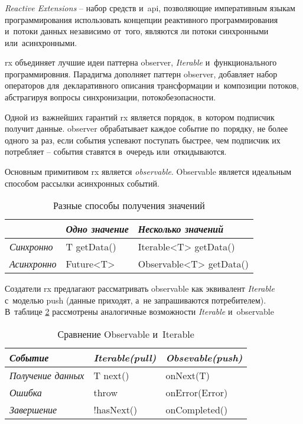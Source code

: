 \subsubsection{}
\label{sec:analysis:research:mobArch:rx}

\emph{Reactive Extensions} -- набор средств и~\gls{api}, позволяющие императивным языкам программирования использовать концепции реактивного программирования и~потоки данных независимо от~того, являются ли потоки синхронными или~асинхронными\cite{wiki:rx}.

\gls{rx} объединяет лучшие идеи паттерна \gls{observer}, \textit{Iterable} и~функционального программировния. Парадигма дополняет паттерн \gls{observer}, добавляет набор операторов для~декларативного описания трансформации и~композиции потоков, абстрагируя вопросы синхронизации, потокобезопасности.

Одной из~важнейших гарантий \gls{rx} является порядок, в~котором подписчик получит данные. \gls{observer} обрабатывает каждое событие по~порядку, не более одного за раз, если события успевают поступать быстрее, чем подписчик их потребляет -- события ставятся в~очередь или~откидываются.

Основным примитивом \gls{rx} является \emph{\gls{observable}}. Observable является идеальным способом рассылки асинхронных событий\cite{programming-in-haskell}.

\begin{table}[h!]
\caption{Разные способы получения значений}
\label{theory:archeticture:rx:call}
\centering
\begin{tabularx}{\textwidth}{ |X|X|X| } 
 \hline
  & \emph{Одно значение} & \emph{Несколько значений} \\ 
 \hline
 \emph{Синхронно} & T getData() & Iterable<T> getData() \\ 
 \hline
 \emph{Асинхронно} & Future<T> & Observable<T> getData() \\ 
 \hline
\end{tabularx}
\end{table}

Создатели \gls{rx} предлагают\cite{reactivex:introduction} рассматривать \gls{observable} как эквивалент \textit{Iterable} с~моделью push (данные приходят, а~не запрашиваются потребителем). В~таблице \ref{theory:archeticture:rx:iterable-observable} рассмотрены аналогичные возможности \textit{Iterable} и~\gls{observable}

\begin{table}[h!]
\caption{Сравнение Observable и~Iterable}
\label{theory:archeticture:rx:iterable-observable}
\centering
\begin{tabularx}{\textwidth}{ |X|X|X| } 
 \hline
 \emph{Событие} & \emph{Iterable(pull)} & \emph{Obsevable(push)} \\ 
 \hline
 \emph{Получение данных} & T next() & onNext(T) \\ 
 \hline
 \emph{Ошибка} & throw & onError(Error) \\ 
 \hline
  \emph{Завершение} & !hasNext() & onCompleted() \\ 
 \hline
\end{tabularx}
\end{table}

